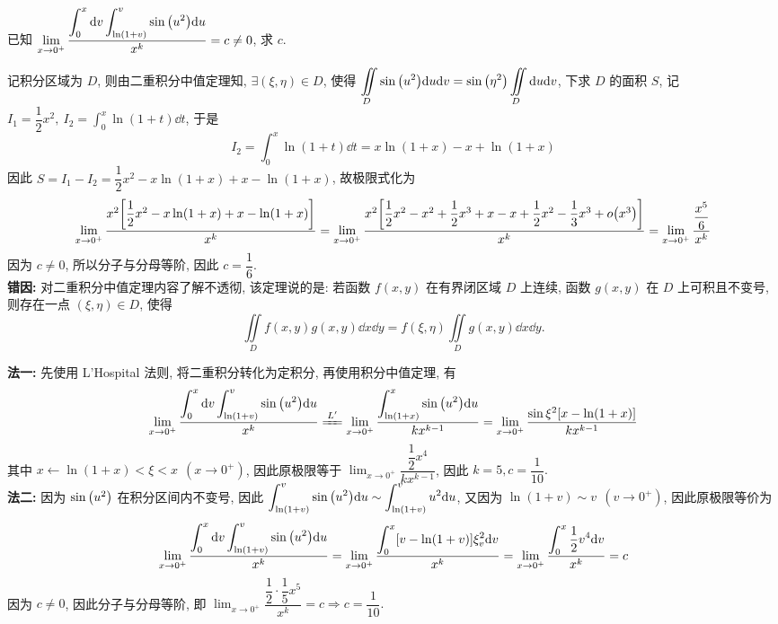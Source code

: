 \begin{example}
    已知 $\displaystyle\lim_{x\to0^+}\dfrac{\displaystyle\int_{0}^{x}\dd v\int_{\ln(1+v)}^{v}\sin\qty(u^2)\dd u}{x^k}=c\neq0$, 求 $c.$
\end{example}
\begin{errorSolution}
    记积分区域为 $D$, 则由二重积分中值定理知, $\exists(\xi,\eta)\in D$, 使得 $\displaystyle\iint\limits_D \sin\qty(u^2)\dd u\dd v=\sin\qty(\eta^2)\iint\limits_D \dd u\dd v$, 下求 $D$ 的面积 $S$,
    记 $I_1=\dfrac{1}{2}x^2,~\displaystyle I_2=\int_{0}^{x}\ln(1+t)\dd t$, 于是 $$I_2=\int_{0}^{x}\ln(1+t)\dd t=x\ln(1+x)-x+\ln(1+x)$$
    因此 $S=I_1-I_2=\dfrac{1}{2}x^2-x\ln(1+x)+x-\ln(1+x)$, 故极限式化为
    $$\lim_{x\to0^+}\dfrac{x^2\qty[\dfrac{1}{2}x^2-x\ln(1+x)+x-\ln(1+x)]}{x^k}=\lim_{x\to0^+}\dfrac{x^2\qty[\dfrac{1}{2}x^2-x^2+\dfrac{1}{2}x^3+x-x+\dfrac{1}{2}x^2-\dfrac{1}{3}x^3+o\qty(x^3)]}{x^k}=\lim_{x\to0^+}\dfrac{\dfrac{x^5}{6}}{x^k}$$
    因为 $c\neq0$, 所以分子与分母等阶, 因此 $c=\dfrac{1}{6}.$\\
    \textbf{错因: }对二重积分中值定理内容了解不透彻, 该定理说的是: 若函数 $f(x,y)$ 在有界闭区域 $D$ 上连续, 函数 $g(x,y)$ 在 $D$ 上可积且不变号, 则存在一点 $(\xi,\eta)\in D$, 使得 $$\iint\limits_D f(x,y)g(x,y)\dd x\dd y=f(\xi,\eta)\iint\limits_D g(x,y)\dd x\dd y.$$
\end{errorSolution}
\begin{solution}
    \textbf{法一: }先使用 L'Hospital 法则, 将二重积分转化为定积分, 再使用积分中值定理, 有
    $$\lim_{x\to0^+}\dfrac{\displaystyle\int_{0}^{x}\dd v\int_{\ln(1+v)}^{v}\sin\qty(u^2)\dd u}{x^k}\xlongequal{L'}\lim_{x\to0^+}\dfrac{\displaystyle\int_{\ln(1+x)}^{x}\sin\qty(u^2)\dd u}{kx^{k-1}}=\lim_{x\to0^+}\dfrac{\sin\xi^2[x-\ln(1+x)]}{kx^{k-1}}$$
    其中 $x\gets\ln(1+x)<\xi<x~~(x\to0^+)$, 因此原极限等于 $\displaystyle\lim_{x\to0^+}\dfrac{\dfrac{1}{2}x^4}{kx^{k-1}}$, 因此 $k=5,c=\dfrac{1}{10}.$\\
    \textbf{法二: }因为 $\sin \qty(u^2)$ 在积分区间内不变号, 因此 $\displaystyle\int_{\ln(1+v)}^{v}\sin\qty(u^2)\dd u\sim\int_{\ln(1+v)}^{v}u^2\dd u$, 又因为 $\ln(1+v)\sim v~~(v\to0^+)$, 因此原极限等价为
    $$\lim_{x\to0^+}\dfrac{\displaystyle\int_{0}^{x}\dd v\int_{\ln(1+v)}^{v}\sin\qty(u^2)\dd u}{x^k}=\lim_{x\to0^+}\dfrac{\displaystyle\int_{0}^{x}[v-\ln(1+v)]\xi_v^2\dd v}{x^k}=\lim_{x\to0^+}\dfrac{\displaystyle \int_{0}^{x}\dfrac{1}{2}v^4\dd v}{x^k}=c$$
    因为 $c\neq0$, 因此分子与分母等阶, 即 $\displaystyle\lim_{x\to0^+}\dfrac{\dfrac{1}{2}\cdot\dfrac{1}{5}x^5}{x^k}=c\Rightarrow c=\dfrac{1}{10}.$
\end{solution}

